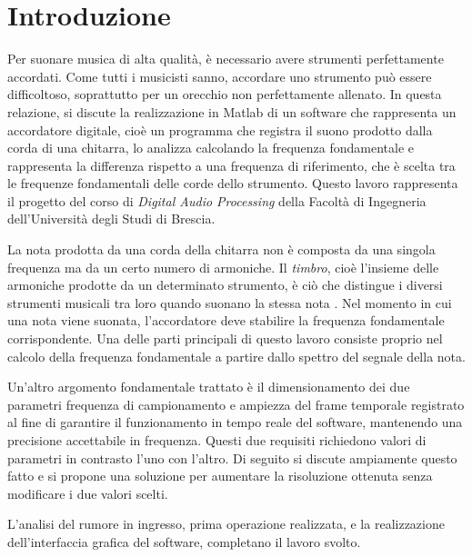 \chapter{Introduzione}

Per suonare musica di alta qualità, è necessario avere strumenti perfettamente accordati.
Come tutti i musicisti sanno, accordare uno strumento può essere difficoltoso, soprattutto per un orecchio non perfettamente allenato.
In questa relazione, si discute la realizzazione in Matlab di un software che rappresenta un accordatore digitale, cioè un programma che registra il suono prodotto dalla corda di una chitarra, lo analizza calcolando la frequenza fondamentale e rappresenta la differenza rispetto a una frequenza di riferimento, che è scelta tra le frequenze fondamentali delle corde dello strumento.
Questo lavoro rappresenta il progetto del corso di \emph{Digital Audio Processing} della Facoltà di Ingegneria dell'Università degli Studi di Brescia.

La nota prodotta da una corda della chitarra non è composta da una singola frequenza ma da un certo numero di armoniche. 
Il \emph{timbro}, cioè l'insieme delle armoniche prodotte da un determinato strumento, è ciò che distingue i diversi strumenti musicali tra loro quando suonano la stessa nota \cite{garzanti_timbro}.
Nel momento in cui una nota viene suonata, l'accordatore deve stabilire la frequenza fondamentale corrispondente.
Una delle parti principali di questo lavoro consiste proprio nel calcolo della frequenza fondamentale a partire dallo spettro del segnale della nota.

Un'altro argomento fondamentale trattato è il dimensionamento dei due parametri frequenza di campionamento e ampiezza del frame temporale registrato al fine di garantire il funzionamento in tempo reale del software, mantenendo una precisione accettabile in frequenza.
Questi due requisiti richiedono valori di parametri in contrasto l'uno con l'altro.
Di seguito si discute ampiamente questo fatto e si propone una soluzione per aumentare la risoluzione ottenuta senza modificare i due valori scelti.

L'analisi del rumore in ingresso, prima operazione realizzata, e la realizzazione dell'interfaccia grafica del software, completano il lavoro svolto.

